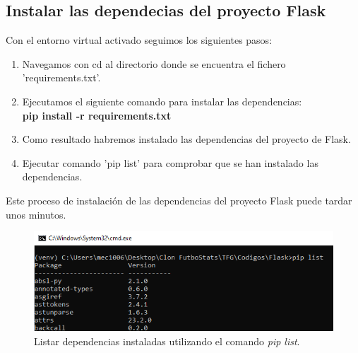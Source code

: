 \subsection{Instalar las dependecias del proyecto Flask}
Con el entorno virtual activado seguimos los siguientes pasos:
\begin{enumerate}
    \item Navegamos con cd al directorio donde se encuentra el fichero 'requirements.txt'.
    \item Ejecutamos el siguiente comando para instalar las dependencias:\\
    \textbf{pip install -r requirements.txt}
    \item Como resultado habremos instalado las dependencias del proyecto de Flask.
    \item Ejecutar comando 'pip list' para comprobar que se han instalado las dependencias.
\end{enumerate}
Este proceso de instalación de las dependencias del proyecto Flask puede tardar unos minutos. \\
\begin{figure}[H]
    \centering
    \includegraphics[width=0.75\linewidth]{img/listarDependencias.png}
    \caption{Listar dependencias instaladas utilizando el comando \textit{pip list}.}
    \label{fig:enter-label}
\end{figure}

